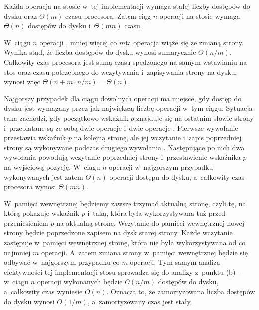 
\subproblem %
Każda operacja na stosie w~tej implementacji wymaga stałej liczby dostępów do dysku oraz $\Theta(m)$ czasu procesora.
Zatem ciąg $n$ operacji na stosie wymaga $\Theta(n)$ dostępów do dysku i~$\Theta(mn)$ czasu.

\subproblem %
W~ciągu $n$ operacji , mniej więcej co $m$\nbhyphen ta operacja wiąże się ze zmianą strony.
Wynika stąd, że liczba dostępów do dysku wynosi sumarycznie $\Theta(n/m)$.
Całkowity czas procesora jest sumą czasu spędzonego na samym wstawianiu na stos oraz czasu potrzebnego do wczytywania i~zapisywania strony na dysku, wynosi więc $\Theta(n+m\cdot n/m)=\Theta(n)$.

\subproblem %
Najgorszy przypadek dla ciągu dowolnych operacji ma miejsce, gdy dostęp do dysku jest wymagany przez jak największą liczbę operacji w~tym ciągu.
Sytuacja taka zachodzi, gdy początkowo wskaźnik $p$ znajduje się na ostatnim słowie strony i~przeplatane są ze sobą dwie operacje  i~dwie operacje .
Pierwsze wywołanie  przestawia wskaźnik $p$ na kolejną stronę, ale jej wczytanie i~zapis poprzedniej strony są wykonywane podczas drugiego wywołania .
Następujące po nich dwa wywołania  powodują wczytanie poprzedniej strony i~przestawienie wskaźnika $p$ na wyjściową pozycję.
W~ciągu $n$ operacji w~najgorszym przypadku wykonywanych jest zatem $\Theta(n)$ operacji dostępu do dysku, a~całkowity czas procesora wynosi $\Theta(mn)$.

\subproblem %
W~pamięci wewnętrznej będziemy zawsze trzymać aktualną stronę, czyli tę, na którą pokazuje wskaźnik $p$ i~taką, która była wykorzystywana tuż przed przeniesieniem $p$ na aktualną stronę.
Wczytanie do pamięci wewnętrznej nowej strony będzie poprzedzone zapisem na dysk starej strony.
Każde wczytanie zastępuje w~pamięci wewnętrznej stronę, która nie była wykorzystywana od co najmniej $m$ operacji.
A~zatem zmiana strony w~pamięci wewnętrznej będzie się odbywać w~najgorszym przypadku co $m$ operacji.
Tym samym analiza efektywności tej implementacji stosu sprowadza się do analizy z~punktu (b) -- w~ciagu $n$ operacji wykonanych będzie $O(n/m)$ dostępów do dysku, a~całkowity czas wyniesie $O(n)$.
Oznacza to, że zamortyzowana liczba dostępów do dysku wynosi $O(1/m)$, a~zamortyzowany czas jest stały.

